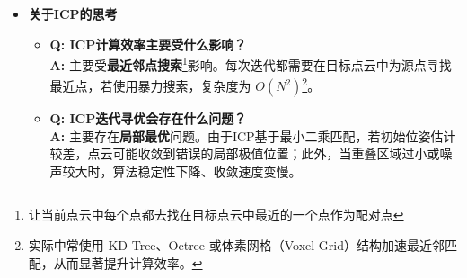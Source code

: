 \documentclass[../main.tex]{subfiles}
\begin{document}
\begin{enumerate}
\begin{itemize}
        \item \textbf{关于ICP的思考}
        \begin{itemize}
            \item \textbf{Q: ICP计算效率主要受什么影响？} \\
            \textbf{A:} 主要受\textbf{最近邻点搜索}\footnote{让当前点云中每个点都去找在目标点云中最近的一个点作为配对点}影响。每次迭代都需要在目标点云中为源点寻找最近点，若使用暴力搜索，复杂度为 $O(N^2)$\footnote{实际中常使用 KD-Tree、Octree 或体素网格（Voxel Grid）结构加速最近邻匹配，从而显著提升计算效率。}。

        
            \item \textbf{Q: ICP迭代寻优会存在什么问题？} \\
            \textbf{A:} 主要存在\textbf{局部最优}问题。由于ICP基于最小二乘匹配，若初始位姿估计较差，点云可能收敛到错误的局部极值位置；此外，当重叠区域过小或噪声较大时，算法稳定性下降、收敛速度变慢。
        

\end{itemize}
\end{itemize}
\end{enumerate}
\end{document}
